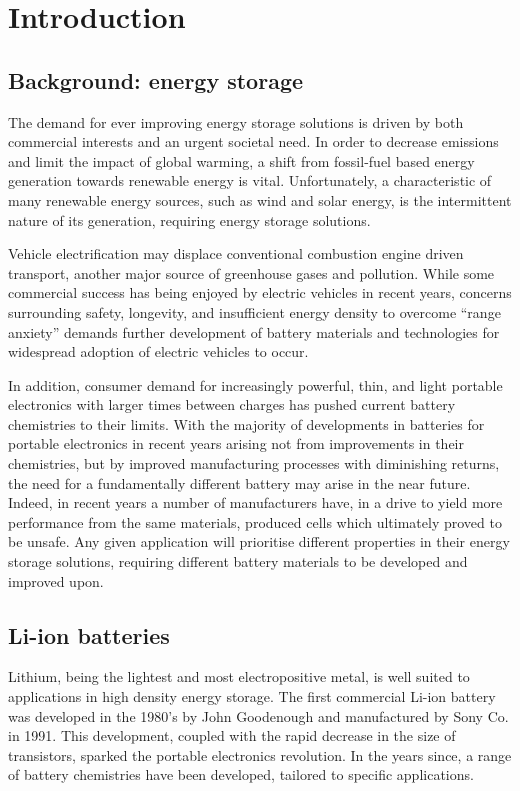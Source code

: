 \chapter{Introduction}
\section{Background: energy storage}
The demand for ever improving energy storage solutions is driven by both commercial interests and an urgent societal need.
In order to decrease  emissions and limit the impact of global warming, a shift from fossil-fuel based energy generation towards renewable energy is vital.\cite{Goodenough2013}
Unfortunately, a characteristic of many renewable energy sources, such as wind and solar energy, is the intermittent nature of its generation, \cite{Goodenough2010a,Ellis2012,Liu2013} requiring energy storage solutions.

Vehicle electrification may displace conventional combustion engine driven transport, another major source of greenhouse gases and pollution.\cite{Blomgren2017}
While some commercial success has being enjoyed by electric vehicles in recent years, concerns surrounding safety, longevity, and insufficient energy density to overcome ``range anxiety'' demands further development of battery materials and technologies for widespread adoption of electric vehicles to occur.\cite{Cano2018a,Schmuch2018}

In addition, consumer demand for increasingly powerful, thin, and light portable electronics with larger times between charges has pushed current battery chemistries to their limits.\cite{Liu2010}
With the majority of developments in batteries for portable electronics in recent years arising not from improvements in their chemistries, but by improved manufacturing processes with diminishing returns, the need for a fundamentally different battery may arise in the near future.
Indeed, in recent years a number of manufacturers have, in a drive to yield more performance from the same materials, produced cells which ultimately proved to be unsafe.\cite{Loveridge2018}
Any given application will prioritise different properties in their energy storage solutions, requiring different battery materials to be developed and improved upon.

\section{Li-ion batteries}
Lithium, being the lightest and most electropositive metal,\cite{Tarascon2010} is well suited to applications in high density energy storage.
The first commercial Li-ion battery was developed in the 1980's by John Goodenough\cite{Mizushima1981} and manufactured by Sony Co. in 1991.\cite{Li2018}
This development, coupled with the rapid decrease in the size of transistors, sparked the portable electronics revolution.
In the years since, a range of battery chemistries have been developed, tailored to specific applications.

